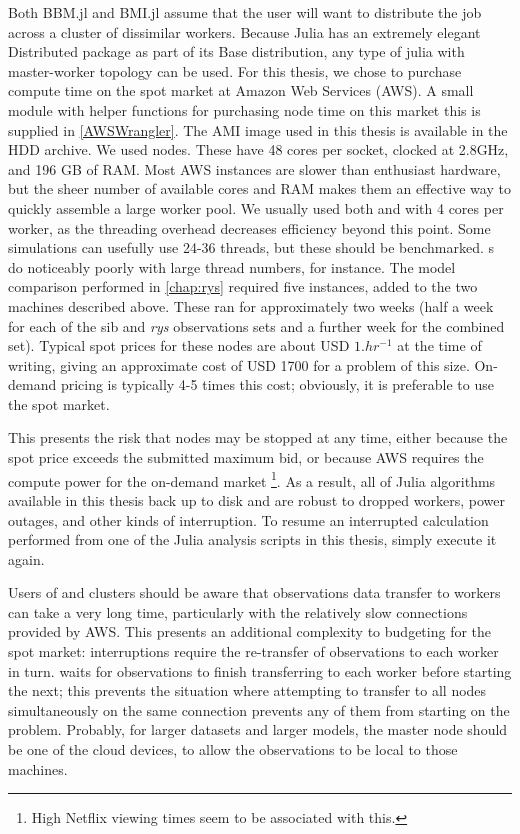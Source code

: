 Both BBM.jl and BMI.jl assume that the user will want to distribute the job across a cluster of dissimilar workers. Because Julia has an extremely elegant Distributed package as part of its Base distribution, any type of julia  with master-worker topology can be used. For this thesis, we chose to purchase compute time on the spot market at Amazon Web Services (AWS). A small module with helper functions for purchasing node time on this market this is supplied in \autoref{AWSWrangler}. The AMI image used in this thesis is available in the HDD archive. We used  nodes. These have 48 cores per socket, clocked at 2.8GHz, and 196 GB of RAM. Most AWS instances are slower than enthusiast hardware, but the sheer number of available cores and RAM makes them an effective way to quickly assemble a large worker pool. We usually used both  and  with 4 cores per worker, as the threading overhead decreases efficiency beyond this point. Some  simulations can usefully use 24-36 threads, but these should be benchmarked. s do noticeably poorly with large thread numbers, for instance. The model comparison performed in \autoref{chap:rys} required five  instances, added to the two machines described above. These ran for approximately two weeks (half a week for each of the sib and \textit{rys} observations sets and a further week for the combined set). Typical spot prices for these nodes are about USD $1.hr^{-1}$ at the time of writing, giving an approximate cost of USD 1700 for a problem of this size. On-demand pricing is typically 4-5 times this cost; obviously, it is preferable to use the spot market.

This presents the risk that nodes may be stopped at any time, either because the spot price exceeds the submitted maximum bid, or because AWS requires the compute power for the on-demand market \footnote{High Netflix viewing times seem to be associated with this.}. As a result, all of Julia algorithms available in this thesis back up to disk and are robust to dropped workers, power outages, and other kinds of interruption. To resume an interrupted calculation performed from one of the Julia analysis scripts in this thesis, simply execute it again.

Users of  and  clusters should be aware that observations data transfer to workers can take a very long time, particularly with the relatively slow connections provided by AWS. This presents an additional complexity to budgeting for the spot market: interruptions require the re-transfer of observations to each worker in turn.  waits for observations to finish transferring to each worker before starting the next; this prevents the situation where attempting to transfer to all nodes simultaneously on the same connection prevents any of them from starting on the problem. Probably, for larger datasets and larger models, the master node should be one of the cloud devices, to allow the observations to be local to those machines.